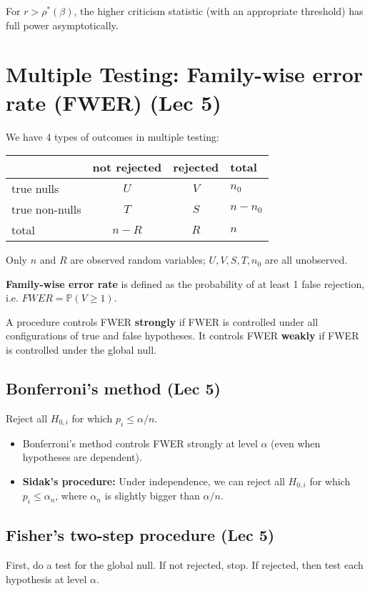 \documentclass[twoside]{article}
\newcommand\bbP{\mathbb{P}}
\begin{document}
For $r > \rho^*(\beta)$, the higher criticism statistic (with an appropriate threshold) has full power asymptotically.

\section{Multiple Testing: Family-wise error rate (FWER) (Lec 5)}
We have 4 types of outcomes in multiple testing:
\begin{center}
  \begin{tabular}{l|cc|l}
  	& not rejected & rejected & total \\ \hline
    true nulls & $U$ & $V$ & $n_0$  \\
    true non-nulls & $T$ & $S$ & $n-n_0$ \\ \hline
    total & $n-R$ & $R$ & $n$
  \end{tabular}
\end{center}

Only $n$ and $R$ are observed random variables; $U, V, S, T, n_0$ are all unobserved.

\textbf{Family-wise error rate} is defined as the probability of at least 1 false rejection, i.e. $FWER = \bbP (V \geq 1)$.

A procedure controls FWER \textbf{strongly} if FWER is controlled under all configurations of true and false hypotheses. It controls FWER \textbf{weakly} if FWER is controlled under the global null.

\subsection{Bonferroni's method (Lec 5)}
Reject all $H_{0,i}$ for which $p_i \leq \alpha / n$.
\begin{itemize}
\item Bonferroni's method controls FWER strongly at level $\alpha$ (even when hypotheses are dependent).

\item \textbf{Sidak's procedure:} Under independence, we can reject all $H_{0,i}$ for which $p_i \leq \alpha_n$, where $\alpha_n$ is slightly bigger than $\alpha/n$.
\end{itemize}

\subsection{Fisher's two-step procedure (Lec 5)}
First, do a test for the global null. If not rejected, stop. If rejected, then test each hypothesis at level $\alpha$.
\end{document}
